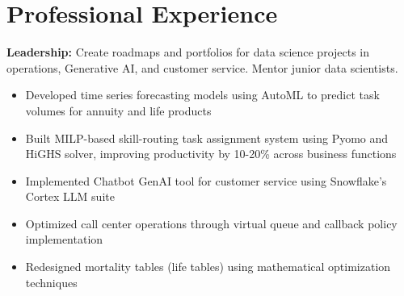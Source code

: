 \documentclass[12pt,a4paper,sans]{moderncv}
\begin{document}
\section{Professional Experience}

{
    \textbf{Leadership:} Create roadmaps and portfolios for data science projects in operations, Generative AI, and customer service. Mentor junior data scientists.
    \begin{itemize}
        \item Developed time series forecasting models using AutoML to predict task volumes for annuity and life products
        \item Built MILP-based skill-routing task assignment system using Pyomo and HiGHS solver, improving productivity by 10-20\% across business functions
        \item Implemented Chatbot GenAI tool for customer service using Snowflake's Cortex LLM suite
        \item Optimized call center operations through virtual queue and callback policy implementation
        \item Redesigned mortality tables (life tables) using mathematical optimization techniques
    \end{itemize}
}
\end{document}
